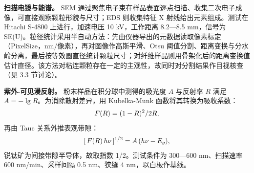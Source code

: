 \textbf{扫描电镜与能谱。} SEM 通过聚焦电子束在样品表面逐点扫描、收集二次电子成像，可直接观察颗粒形貌与尺寸；EDS 则收集特征 X 射线给出元素组成\cite{huang2003分析}。测试在 Hitachi S-4800 上进行，加速电压 10 kV，工作距离 8.2—8.5 mm，信号为 SE(U)。粒径统计采用半自动方法：先由仪器导出的元数据读取像素标定（PixelSize，nm/像素），再对图像作高斯平滑、Otsu 阈值分割、距离变换与分水岭分离，最后按等效圆直径统计颗粒尺寸；对纤维样品则用骨架化后的距离变换值估计直径。该方法对粘连颗粒存在一定的主观性，故同时对分割结果作目视核查（见 3.3 节讨论）。

\textbf{紫外-可见漫反射。} 粉末样品在积分球中测得的吸光度 $A$ 与反射率 $R$ 满足 $A=-\lg R$。为消除散射差异，用 Kubelka-Munk 函数将其转换为吸收系数：
\begin{equation}\small
  F(R)=(1-R)^2/2R,
  \label{eq:km}
\end{equation}
再由 Tauc 关系外推表观带隙：
\begin{equation}\small
  [\,F(R)\,h\nu\,]^{1/2}=A\,(h\nu-E_g),
  \label{eq:tauc}
\end{equation}
锐钛矿为间接带隙半导体，故取指数 1/2。测试条件为 300—600 nm、扫描速率 600 nm/min、采样间隔 0.5 nm、狭缝 4 nm，以白板作基线。

